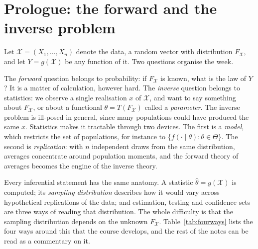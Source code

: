 \documentclass[11pt,a4paper]{article}
\begin{document}
\newpage
\thispagestyle{empty}
{\small\tableofcontents}
\newpage

\section*{Prologue: the forward and the inverse problem}

Let $\mathcal X=(X_1,\dots,X_n)$ denote the data, a random vector with distribution $F_{\mathcal X}$, and let $Y=g(\mathcal X)$ be any function of it. Two questions organise the week.

The \emph{forward} question belongs to probability: if $F_{\mathcal X}$ is known, what is the law of $Y$? It is a matter of calculation, however hard. The \emph{inverse} question belongs to statistics: we observe a single realisation $x$ of $\mathcal X$, and want to say something about $F_{\mathcal X}$, or about a functional $\theta=T(F_{\mathcal X})$ called a \emph{parameter}. The inverse problem is ill-posed in general, since many populations could have produced the same $x$. Statistics makes it tractable through two devices. The first is a \emph{model}, which restricts the set of populations, for instance to $\{f(\cdot\mid\theta):\theta\in\Theta\}$. The second is \emph{replication}: with $n$ independent draws from the same distribution, averages concentrate around population moments, and the forward theory of averages becomes the engine of the inverse theory.

Every inferential statement has the same anatomy. A statistic $\hat\theta=g(\mathcal X)$ is computed; its \emph{sampling distribution} describes how it would vary across hypothetical replications of the data; and estimation, testing and confidence sets are three ways of reading that distribution. The whole difficulty is that the sampling distribution depends on the unknown $F_{\mathcal X}$. Table~\ref{tab:fourways} lists the four ways around this that the course develops, and the rest of the notes can be read as a commentary on it.
\end{document}
